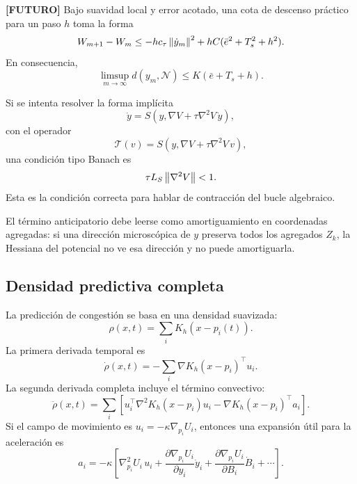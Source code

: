 \begin{proposicion}
\textbf{[FUTURO]}
Bajo suavidad local y error acotado, una cota de descenso práctico para un paso $h$ toma
la forma
\begin{equation}
  W_{m+1}-W_m
  \le
  -h c_\tau\left\|\dot y_m\right\|^2
  +
  hC(\bar e^2+T_s^2+h^2).
  \label{eq:anexo_descenso_sampled}
\end{equation}
En consecuencia,
\begin{equation}
  \limsup_{m\to\infty}d(y_m,\mathcal{N})
  \le
  K(\bar e+T_s+h).
  \label{eq:anexo_limsup_sampled}
\end{equation}
\end{proposicion}

\begin{observacion}
Si se intenta resolver la forma implícita
\[
  \dot y=S\left(y,\nabla V+\tau\nabla^2V\,\dot y\right),
\]
con el operador
\[
  \mathcal{T}(v)=S\left(y,\nabla V+\tau\nabla^2V\,v\right),
\]
una condición tipo Banach es
\begin{equation}
  \tau L_S\left\|\nabla^2V\right\|<1.
  \label{eq:anexo_contraccion_implicita}
\end{equation}
Esta es la condición correcta para hablar de contracción del bucle algebraico.
\end{observacion}

El término anticipatorio debe leerse como amortiguamiento en coordenadas agregadas:
si una dirección microscópica de $y$ preserva todos los agregados $Z_k$, la Hessiana del
potencial no ve esa dirección y no puede amortiguarla.

\subsection{Densidad predictiva completa}
\label{subsec:densidad-predictiva-completa}

La predicción de congestión se basa en una densidad suavizada:
\begin{equation}
  \rho(x,t)=\sum_i K_h(x-p_i(t)).
  \label{eq:anexo_densidad}
\end{equation}
La primera derivada temporal es
\begin{equation}
  \dot\rho(x,t)
  =
  -\sum_i\nabla K_h(x-p_i)^\top u_i.
  \label{eq:anexo_densidad_dot}
\end{equation}
La segunda derivada completa incluye el término convectivo:
\begin{equation}
  \ddot\rho(x,t)
  =
  \sum_i
  \left[
    u_i^\top\nabla^2K_h(x-p_i)u_i
    -
    \nabla K_h(x-p_i)^\top a_i
  \right].
  \label{eq:anexo_densidad_ddot}
\end{equation}
Si el campo de movimiento es $u_i=-\kappa\nabla_{p_i}U_i$, entonces una expansión útil
para la aceleración es
\begin{equation}
  a_i=
  -\kappa
  \left[
    \nabla_{p_i}^2U_i\,u_i
    +
    \frac{\partial\nabla_{p_i}U_i}{\partial y_i}\dot y_i
    +
    \frac{\partial\nabla_{p_i}U_i}{\partial B_i}\dot B_i
    +\cdots
  \right].
  \label{eq:anexo_aceleracion_campo}
\end{equation}

